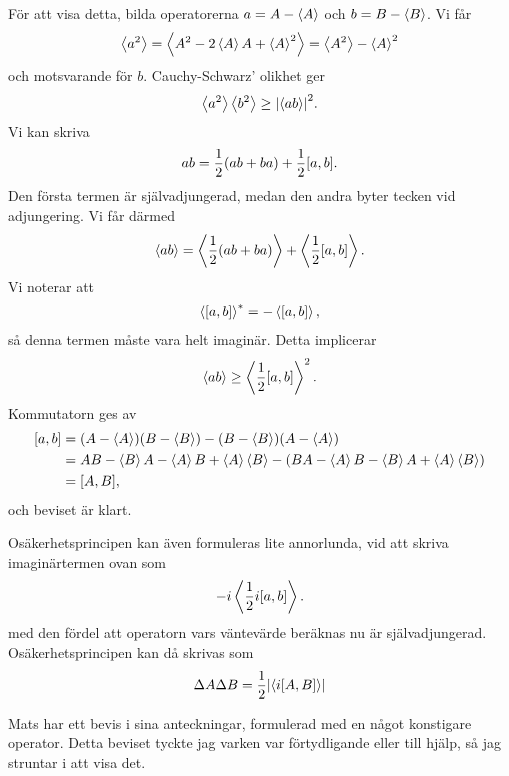 För att visa detta, bilda operatorerna $a = A - \expval{A}$ och $b = B - \expval{B}$. Vi får
\begin{align*}
	\expval{a^{2}} = \expval{A^{2} - 2\expval{A}A + \expval{A}^{2}} = \expval{A^{2}} - \expval{A}^{2}
\end{align*}
och motsvarande för $b$. Cauchy-Schwarz' olikhet ger
\begin{align*}
	\expval{a^{2}}\expval{b^{2}}\geq\abs{\expval{ab}}^{2}.
\end{align*}
Vi kan skriva
\begin{align*}
	ab = \frac{1}{2}(ab + ba) + \frac{1}{2}[a, b].
\end{align*}
Den första termen är självadjungerad, medan den andra byter tecken vid adjungering. Vi får därmed
\begin{align*}
	\expval{ab} = \expval{\frac{1}{2}(ab + ba)} + \expval{\frac{1}{2}[a, b]}.
\end{align*}
Vi noterar att
\begin{align*}
	\expval{[a, b]}^{*} = -\expval{[a, b]},
\end{align*}
så denna termen måste vara helt imaginär. Detta implicerar
\begin{align*}
	\expval{ab} \geq \expval{\frac{1}{2}[a, b]}^{2}.
\end{align*}
Kommutatorn ges av
\begin{align*}
	[a, b] &= (A - \expval{A})(B - \expval{B}) - (B - \expval{B})(A - \expval{A}) \\
	              &= AB - \expval{B}A - \expval{A}B + \expval{A}\expval{B} - (BA - \expval{A}B - \expval{B}A + \expval{A}\expval{B}) \\
	              &= [A, B],
\end{align*}
och beviset är klart.

Osäkerhetsprincipen kan även formuleras lite annorlunda, vid att skriva imaginärtermen ovan som
\begin{align*}
	-i\expval{\frac{1}{2}i[a, b]}.
\end{align*}
med den fördel att operatorn vars väntevärde beräknas nu är självadjungerad. Osäkerhetsprincipen kan då skrivas som
\begin{align*}
	\Delta A\Delta B = \frac{1}{2}\abs{\expval{i[A, B]}}
\end{align*}

Mats har ett bevis i sina anteckningar, formulerad med en något konstigare operator. Detta beviset tyckte jag varken var förtydligande eller till hjälp, så jag struntar i att visa det.

